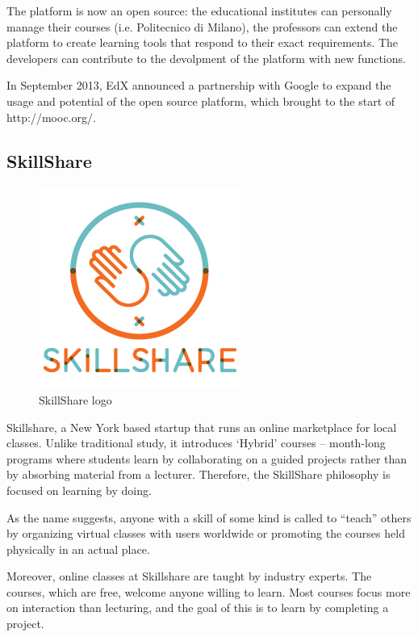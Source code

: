 The platform is now an open source: the educational institutes can personally manage their courses (i.e. Politecnico di Milano), the professors can extend the platform to create learning tools that respond to their exact requirements. The developers can contribute to the devolpment of the platform with new functions.

In September 2013, EdX announced a partnership with Google to expand the usage and potential of the open source platform, which brought to the start of http://mooc.org/.


\subsection{SkillShare}
\label{subsec:SkillShare}
\begin{figure}[htb] %
 \centering
 \includegraphics[width=0.5\linewidth]{images/chapter1/skillshare.jpg}\hfill
 \caption[SkillShare logo]{SkillShare logo}
 \label{fig:fourV}
\end{figure}




Skillshare, a New York based startup that runs an online marketplace for local classes.
Unlike traditional study, it introduces ‘Hybrid’ courses – month-long programs where students learn by collaborating on a guided projects rather than by absorbing material from a lecturer. Therefore, the SkillShare philosophy is focused on learning by doing.

As the name suggests, anyone with a skill of some kind is called to “teach” others by organizing virtual classes with users worldwide or promoting the courses held physically in an actual place.

Moreover, online classes at Skillshare are taught by industry experts. The courses, which are free, welcome anyone willing to learn. Most courses focus more on interaction than lecturing, and the goal of this is to learn by completing a project.

